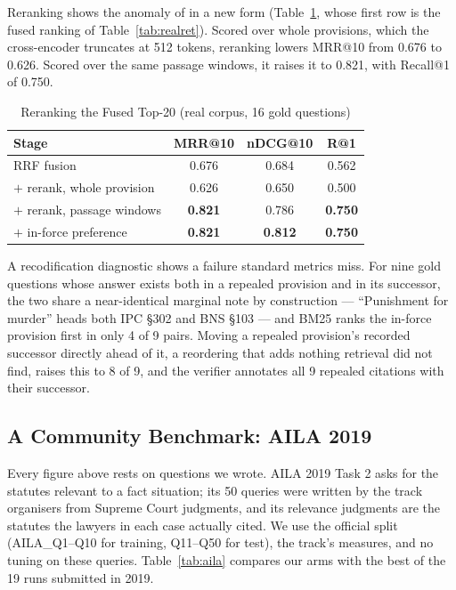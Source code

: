 \documentclass[conference]{IEEEtran}
\begin{document}
Reranking shows the anomaly of \cite{rustamov2025} in a new form (Table~\ref{tab:realrerank}, whose first row is the fused ranking of Table~\ref{tab:realret}). Scored over whole provisions, which the cross-encoder truncates at 512 tokens, reranking lowers MRR@10 from 0.676 to 0.626. Scored over the same passage windows, it raises it to 0.821, with Recall@1 of 0.750.

\begin{table}[t]
\caption{Reranking the Fused Top-20 (real corpus, 16 gold questions)}
\label{tab:realrerank}
\centering
\footnotesize
\begin{tabular}{@{}lccc@{}}
\toprule
\textbf{Stage} & \textbf{MRR@10} & \textbf{nDCG@10} & \textbf{R@1} \\
\midrule
RRF fusion                       & 0.676 & 0.684 & 0.562 \\
$+$ rerank, whole provision      & 0.626 & 0.650 & 0.500 \\
$+$ rerank, passage windows      & \textbf{0.821} & 0.786 & \textbf{0.750} \\
$+$ in-force preference          & \textbf{0.821} & \textbf{0.812} & \textbf{0.750} \\
\bottomrule
\end{tabular}
\end{table}

A recodification diagnostic shows a failure standard metrics miss. For nine gold questions whose answer exists both in a repealed provision and in its successor, the two share a near-identical marginal note by construction --- ``Punishment for murder'' heads both IPC \S302 and BNS \S103 --- and BM25 ranks the in-force provision first in only 4 of 9 pairs. Moving a repealed provision's recorded successor directly ahead of it, a reordering that adds nothing retrieval did not find, raises this to 8 of 9, and the verifier annotates all 9 repealed citations with their successor.

\subsection{A Community Benchmark: AILA 2019}
\label{ssec:aila}

Every figure above rests on questions we wrote. AILA 2019 Task 2 \cite{bhattacharya2019} asks for the statutes relevant to a fact situation; its 50 queries were written by the track organisers from Supreme Court judgments, and its relevance judgments are the statutes the lawyers in each case actually cited. We use the official split (AILA\_Q1--Q10 for training, Q11--Q50 for test), the track's measures, and no tuning on these queries. Table~\ref{tab:aila} compares our arms with the best of the 19 runs submitted in 2019.
\end{document}
